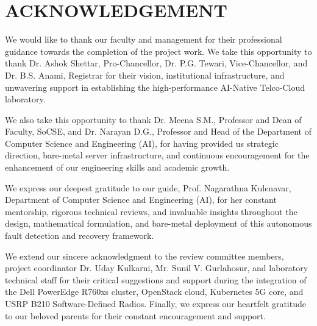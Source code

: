 


\setcounter{page}{1}

\chapter*{ACKNOWLEDGEMENT}
\thispagestyle{plain}
We would like to thank our faculty and management for their professional guidance towards the completion of the project work. We take this opportunity to thank Dr. Ashok Shettar, Pro-Chancellor, Dr. P.G. Tewari, Vice-Chancellor, and Dr. B.S. Anami, Registrar for their vision, institutional infrastructure, and unwavering support in establishing the high-performance AI-Native Telco-Cloud laboratory.

\vspace{0.4cm}
We also take this opportunity to thank Dr. Meena S.M., Professor and Dean of Faculty, SoCSE, and Dr. Narayan D.G., Professor and Head of the Department of Computer Science and Engineering (AI), for having provided us strategic direction, bare-metal server infrastructure, and continuous encouragement for the enhancement of our engineering skills and academic growth.

\vspace{0.4cm}
We express our deepest gratitude to our guide, Prof. Nagarathna Kulenavar, Department of Computer Science and Engineering (AI), for her constant mentorship, rigorous technical reviews, and invaluable insights throughout the design, mathematical formulation, and bare-metal deployment of this autonomous fault detection and recovery framework.

\vspace{0.4cm}
We extend our sincere acknowledgment to the review committee members, project coordinator Dr. Uday Kulkarni, Mr. Sunil V. Gurlahosur, and laboratory technical staff for their critical suggestions and support during the integration of the Dell PowerEdge R760xs cluster, OpenStack cloud, Kubernetes 5G core, and USRP B210 Software-Defined Radios. Finally, we express our heartfelt gratitude to our beloved parents for their constant encouragement and support.

